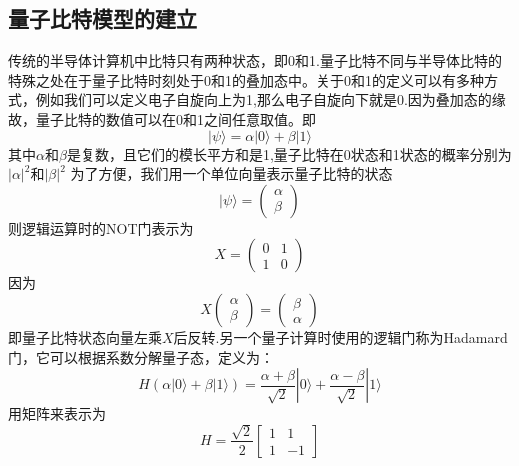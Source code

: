 \documentclass{article}
\begin{document}
\subsection{量子比特模型的建立}
\label{subsec:label}
传统的半导体计算机中比特只有两种状态，即0和1.量子比特不同与半导体比特的特殊之处在于量子比特时刻处于0和1的叠加态中。关于0和1的定义可以有多种方式，例如我们可以定义电子自旋向上为1,那么电子自旋向下就是0.因为叠加态的缘故，量子比特的数值可以在0和1之间任意取值。即
\begin{equation}
  \label{}
\vert \psi \rangle = \alpha \vert 0 \rangle + \beta \vert 1 \rangle
\end{equation}
其中$\alpha$和$\beta$是复数，且它们的模长平方和是1,量子比特在0状态和1状态的概率分别为$|\alpha|^{2}$和$|\beta|^{2}$
为了方便，我们用一个单位向量表示量子比特的状态
\begin{equation}
  \label{}
|\psi \rangle = \left(\begin{matrix}
    \alpha\\
    \beta
  \end{matrix}\right)
\end{equation}
则逻辑运算时的NOT门表示为
\begin{equation}
  \label{}
  X = \left(
    \begin{matrix}
      0 & 1\\
      1 & 0
    \end{matrix}
    \right)
\end{equation}
因为
\begin{equation}
  \label{}
X\left( \begin{matrix}
    \alpha\\
    \beta
  \end{matrix}\right)
=\left(\begin{matrix}
  \beta\\
  \alpha
\end{matrix}\right)
\end{equation}
即量子比特状态向量左乘$X$后反转.另一个量子计算时使用的逻辑门称为Hadamard门，它可以根据系数分解量子态，定义为：
\begin{equation}
  \label{}
H(\alpha | 0 \rangle + \beta | 1 \rangle ) = \frac{\alpha+\beta}{\sqrt{2}} | 0 \rangle + \frac{\alpha - \beta}{\sqrt{2}} | 1 \rangle
\end{equation}
用矩阵来表示为
\begin{equation}
  \label{}
  H=\frac{\sqrt{2}}{2}\left[
  \begin{matrix}
    1 & 1\\
    1 & -1
  \end{matrix}\right]
\end{equation}
\end{document}
